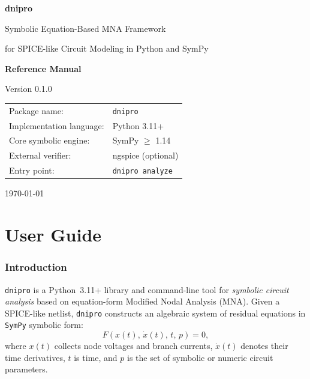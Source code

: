 \documentclass[11pt,a4paper]{article}
\newcommand{\project}{\texttt{dnipro}}
\newcommand{\mna}{Modified Nodal Analysis}
\newcommand{\sympy}{\texttt{SymPy}}
\newcommand{\pyver}{Python~3.11+}
\begin{document}
\begin{titlepage}
    \centering
    \vspace*{20mm}
    {\Huge\bfseries dnipro\par}
    \vspace{8mm}
    {\Large Symbolic Equation-Based MNA Framework\par}
    \vspace{3mm}
    {\large for SPICE-like Circuit Modeling in Python and SymPy\par}
    \vspace{18mm}
    {\Large\bfseries Reference Manual\par}
    \vspace{5mm}
    {\large Version 0.1.0\par}
    \vfill
    \begin{tabular}{ll}
        Package name:            & \texttt{dnipro} \\
        Implementation language: & Python 3.11+ \\
        Core symbolic engine:    & SymPy \(\geq\) 1.14 \\
        External verifier:       & ngspice (optional) \\
        Entry point:             & \texttt{dnipro analyze} \\
    \end{tabular}
    \vfill
    {\large \today\par}
\end{titlepage}

\tableofcontents
\newpage

\part{User Guide}

\section{Introduction}
\label{sec:introduction}

\project{} is a \pyver{} library and command-line tool for \emph{symbolic circuit analysis}
based on equation-form \mna{} (MNA).
Given a SPICE-like netlist, \project{} constructs an algebraic system of residual equations
in \sympy{} symbolic form:
\begin{equation}
    F\!\left(x(t),\,\dot{x}(t),\,t,\,p\right) = 0,
\end{equation}
where \(x(t)\) collects node voltages and branch currents,
\(\dot{x}(t)\) denotes their time derivatives,
\(t\) is time, and \(p\) is the set of symbolic or numeric circuit parameters.
\end{document}
